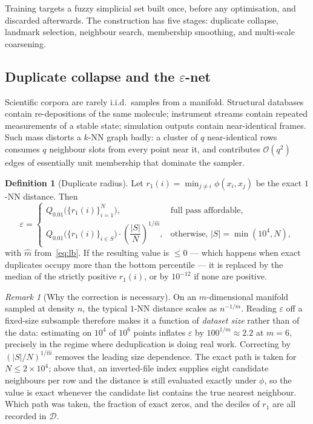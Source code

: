 \documentclass[12pt]{iopart}
\theoremstyle{definition}
\newtheorem{definition}{Definition}
\theoremstyle{plain}
\theoremstyle{remark}
\newtheorem{remark}{Remark}
\newcommand{\abs}[1]{\left\lvert#1\right\rvert}
\begin{document}
Training targets a fuzzy simplicial set built once, before any optimisation,
and discarded afterwards. The construction has five stages: duplicate collapse,
landmark selection, neighbour search, membership smoothing, and multi-scale
coarsening.

\subsection{Duplicate collapse and the $\varepsilon$-net}
\label{sec:epsilon}

Scientific corpora are rarely i.i.d.\ samples from a manifold. Structural
databases contain re-depositions of the same molecule; instrument streams
contain repeated measurements of a stable state; simulation outputs contain
near-identical frames. Such mass distorts a $k$-NN graph badly: a cluster of
$q$ near-identical rows consumes $q$ neighbour slots from every point near it,
and contributes $\mathcal{O}(q^2)$ edges of essentially unit membership that
dominate the sampler.

\begin{definition}[Duplicate radius]
\label{def:eps}
Let $r_1(i)=\min_{j\neq i}\phi(x_i,x_j)$ be the exact $1$-NN distance. Then
\begin{equation}
\label{eq:eps}
\varepsilon
=
\begin{cases}
Q_{0.01}\bigl(\{r_1(i)\}_{i=1}^{N}\bigr),
  & \text{full pass affordable},\\[4pt]
Q_{0.01}\bigl(\{r_1(i)\}_{i\in S}\bigr)\cdot
  \left(\dfrac{\abs{S}}{N}\right)^{1/\hat m},
  & \text{otherwise, } \abs{S}=\min(10^4,N),
\end{cases}
\end{equation}
with $\hat m$ from~\eqref{eq:lb}. If the resulting value is $\le 0$ --- which
happens when exact duplicates occupy more than the bottom percentile --- it is
replaced by the median of the strictly positive $r_1(i)$, or by $10^{-12}$ if
none are positive.
\end{definition}

\begin{remark}[Why the correction is necessary]
\label{rem:epsdrift}
On an $m$-dimensional manifold sampled at density $n$, the typical $1$-NN
distance scales as $n^{-1/m}$. Reading $\varepsilon$ off a fixed-size subsample
therefore makes it a function of \emph{dataset size} rather than of the data:
estimating on $10^4$ of $10^6$ points inflates $\varepsilon$ by
$100^{1/m}\approx 2.2$ at $m=6$, precisely in the regime where deduplication is
doing real work. Correcting by $(\abs{S}/N)^{1/\hat m}$ removes the leading
size dependence. The exact path is taken for $N\le 2\times 10^4$; above that, an
inverted-file index supplies eight candidate neighbours per row and the
distance is still evaluated exactly under $\phi$, so the value is exact whenever
the candidate list contains the true nearest neighbour. Which path was taken,
the fraction of exact zeros, and the deciles of $r_1$ are all recorded in
$\mathcal{D}$.
\end{remark}
\end{document}
